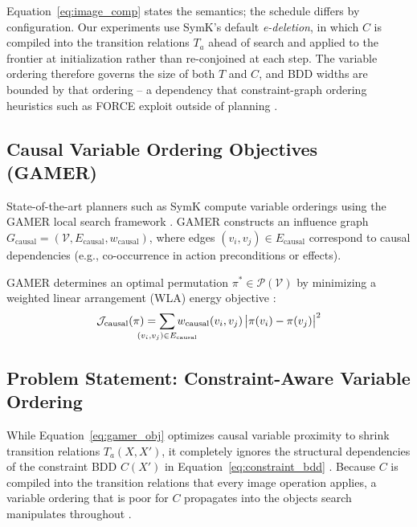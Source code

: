 \documentclass[twocolumn,10pt]{article}
\begin{document}
\noindent Equation~\ref{eq:image_comp} states the semantics; the schedule differs by configuration. Our experiments use \textsf{SymK}'s default \emph{e-deletion}, in which $C$ is compiled into the transition relations $T_a$ ahead of search and applied to the frontier at initialization rather than re-conjoined at each step. The variable ordering therefore governs the size of both $T$ and $C$, and BDD widths are bounded by that ordering \cite{kissmann2014bdd} -- a dependency that constraint-graph ordering heuristics such as \textsf{FORCE} exploit outside of planning \cite{aloul2003force}.

\subsection{Causal Variable Ordering Objectives (GAMER)}
State-of-the-art planners such as \textsf{SymK} \cite{speck2020symk} compute variable orderings using the \textsf{GAMER} local search framework \cite{edelkamp2008gamer, kissmann2014bdd}. \textsf{GAMER} constructs an influence graph $G_{\text{causal}} = (\mathcal{V}, E_{\text{causal}}, w_{\text{causal}})$, where edges $(v_i, v_j) \in E_{\text{causal}}$ correspond to causal dependencies (e.g., co-occurrence in action preconditions or effects).

\textsf{GAMER} determines an optimal permutation $\pi^* \in \mathcal{P}(\mathcal{V})$ by minimizing a weighted linear arrangement (WLA) energy objective \cite{edelkamp2008gamer, kissmann2014bdd}:
\begin{equation}
    \mathcal{J}_{\text{causal}}(\pi) = \sum_{\mathclap{(v_i, v_j) \in E_{\text{causal}}}} w_{\text{causal}}(v_i, v_j) \, \bigl| \pi(v_i) - \pi(v_j) \bigr|^2
    \label{eq:gamer_obj}
\end{equation}

\subsection{Problem Statement: Constraint-Aware Variable Ordering}
While Equation~\ref{eq:gamer_obj} optimizes causal variable proximity to shrink transition relations $T_a(X, X')$, it completely ignores the structural dependencies of the constraint BDD $C(X')$ in Equation~\ref{eq:constraint_bdd} \cite{torralba2013constrained}. Because $C$ is compiled into the transition relations that every image operation applies, a variable ordering that is poor for $C$ propagates into the objects search manipulates throughout \cite{torralba2013constrained}.
\end{document}
